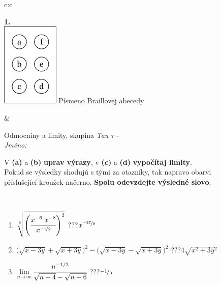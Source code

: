 \documentclass[10pt]{report}
\begin{document}
\begin{tabular}{c:c}
\begin{minipage}[c][104.5mm][t]{0.5\linewidth}
\begin{center}
\begin{minipage}{0.20\linewidth}
\begin{center}
{\Huge\bfseries 1.} \\[2mm]
\includegraphics[height=40mm]{../images/braille.png}
{\small Písmeno Braillovej abecedy}
\end{center}
\end{minipage}
\end{center}
\end{minipage}
&
\begin{minipage}[c][104.5mm][t]{0.5\linewidth}
\begin{center}
\vspace{7mm}
{\huge Odmocniny a limity, skupina \textit{Tau $\tau$} -}\\[5mm]
\textit{Jméno:}\phantom{xxxxxxxxxxxxxxxxxxxxxxxxxxxxxxxxxxxxxxxxxxxxxxxxxxxxxxxxxxxxxxxxx}\\[5mm]
\begin{minipage}{0.95\linewidth}
\begin{center}
V \textbf{(a)} a \textbf{(b)} \textbf{uprav výrazy}, v \textbf{(c)} a \textbf{(d)} \textbf{vypočítaj limity}.\\Pokud se výsledky shodujú s tými za otazníky, tak napravo obarvi\\příslušející kroužek načerno. \textbf{Spolu odevzdejte výsledné slovo}.
\end{center}
\end{minipage}
\\[1mm]
\begin{minipage}{0.79\linewidth}
\begin{center}
\begin{varwidth}{\linewidth}
\begin{enumerate}
\small
\item $\sqrt[8]{\left(\cfrac{x^{-6}\;x^{-8}}{x^{\nicefrac{-1}{2}}}\right)^{2}}$\quad \dotfill\; ???\;\dotfill \quad $x^{\nicefrac{-27}{8}}$
\item {\footnotesize{\scriptsize$\big(\sqrt{x-3y}+\sqrt{x+3y}\big)^2-\big(\sqrt{x-3y}-\sqrt{x+3y}\big)^2$}\quad \dotfill\; ???\;\dotfill \quad $4\sqrt{x^2+3y^2}$}
\item $\lim\limits_{n\to\infty}\cfrac{n^{-1/2}}{\sqrt{n-4}-\sqrt{n+6}}$\quad \dotfill\; ???\;\dotfill \quad $\nicefrac{-1}{5}$

\end{enumerate}
\end{varwidth}
\end{center}
\end{minipage}
\end{center}
\end{minipage}
\end{tabular}
\end{document}
